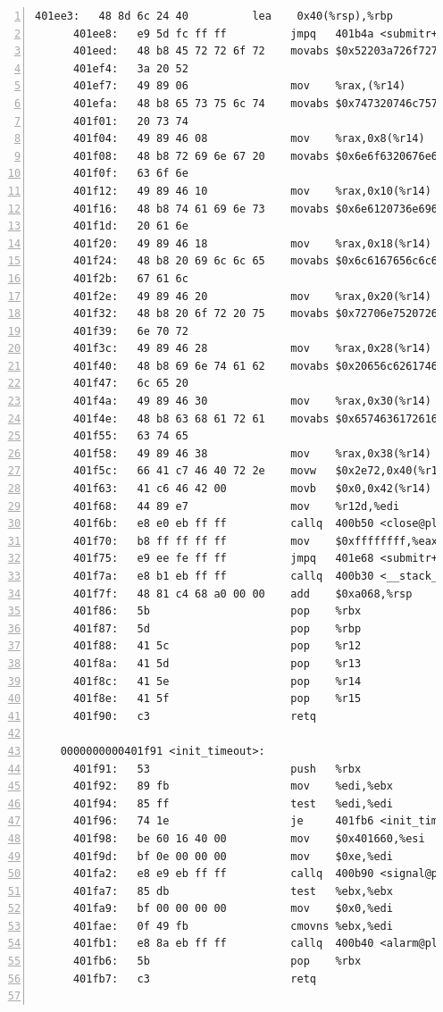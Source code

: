 \documentclass{article}
\begin{document}
\begin{lstlisting}[title = bomb的反汇编代码及部分注释, xleftmargin = 2em,xrightmargin = 2em, aboveskip = 1em, numbers = left, basicstyle=\scriptsize\ttfamily, numberstyle=\scriptsize]
      401ee3:	48 8d 6c 24 40       	lea    0x40(%rsp),%rbp
      401ee8:	e9 5d fc ff ff       	jmpq   401b4a <submitr+0x39e>
      401eed:	48 b8 45 72 72 6f 72 	movabs $0x52203a726f727245,%rax
      401ef4:	3a 20 52 
      401ef7:	49 89 06             	mov    %rax,(%r14)
      401efa:	48 b8 65 73 75 6c 74 	movabs $0x747320746c757365,%rax
      401f01:	20 73 74 
      401f04:	49 89 46 08          	mov    %rax,0x8(%r14)
      401f08:	48 b8 72 69 6e 67 20 	movabs $0x6e6f6320676e6972,%rax
      401f0f:	63 6f 6e 
      401f12:	49 89 46 10          	mov    %rax,0x10(%r14)
      401f16:	48 b8 74 61 69 6e 73 	movabs $0x6e6120736e696174,%rax
      401f1d:	20 61 6e 
      401f20:	49 89 46 18          	mov    %rax,0x18(%r14)
      401f24:	48 b8 20 69 6c 6c 65 	movabs $0x6c6167656c6c6920,%rax
      401f2b:	67 61 6c 
      401f2e:	49 89 46 20          	mov    %rax,0x20(%r14)
      401f32:	48 b8 20 6f 72 20 75 	movabs $0x72706e7520726f20,%rax
      401f39:	6e 70 72 
      401f3c:	49 89 46 28          	mov    %rax,0x28(%r14)
      401f40:	48 b8 69 6e 74 61 62 	movabs $0x20656c6261746e69,%rax
      401f47:	6c 65 20 
      401f4a:	49 89 46 30          	mov    %rax,0x30(%r14)
      401f4e:	48 b8 63 68 61 72 61 	movabs $0x6574636172616863,%rax
      401f55:	63 74 65 
      401f58:	49 89 46 38          	mov    %rax,0x38(%r14)
      401f5c:	66 41 c7 46 40 72 2e 	movw   $0x2e72,0x40(%r14)
      401f63:	41 c6 46 42 00       	movb   $0x0,0x42(%r14)
      401f68:	44 89 e7             	mov    %r12d,%edi
      401f6b:	e8 e0 eb ff ff       	callq  400b50 <close@plt>
      401f70:	b8 ff ff ff ff       	mov    $0xffffffff,%eax
      401f75:	e9 ee fe ff ff       	jmpq   401e68 <submitr+0x6bc>
      401f7a:	e8 b1 eb ff ff       	callq  400b30 <__stack_chk_fail@plt>
      401f7f:	48 81 c4 68 a0 00 00 	add    $0xa068,%rsp
      401f86:	5b                   	pop    %rbx
      401f87:	5d                   	pop    %rbp
      401f88:	41 5c                	pop    %r12
      401f8a:	41 5d                	pop    %r13
      401f8c:	41 5e                	pop    %r14
      401f8e:	41 5f                	pop    %r15
      401f90:	c3                   	retq   
    
    0000000000401f91 <init_timeout>:
      401f91:	53                   	push   %rbx
      401f92:	89 fb                	mov    %edi,%ebx
      401f94:	85 ff                	test   %edi,%edi
      401f96:	74 1e                	je     401fb6 <init_timeout+0x25>
      401f98:	be 60 16 40 00       	mov    $0x401660,%esi
      401f9d:	bf 0e 00 00 00       	mov    $0xe,%edi
      401fa2:	e8 e9 eb ff ff       	callq  400b90 <signal@plt>
      401fa7:	85 db                	test   %ebx,%ebx
      401fa9:	bf 00 00 00 00       	mov    $0x0,%edi
      401fae:	0f 49 fb             	cmovns %ebx,%edi
      401fb1:	e8 8a eb ff ff       	callq  400b40 <alarm@plt>
      401fb6:	5b                   	pop    %rbx
      401fb7:	c3                   	retq   
    

\end{lstlisting}
\end{document}
